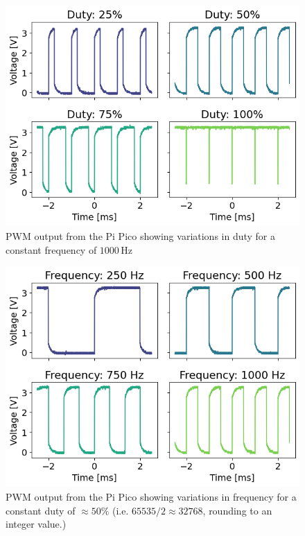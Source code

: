 \documentclass[%
 reprint,
 amsmath,amssymb,
 aps,
]{revtex4-2}
\begin{document}
    \begin{figure}
        \includegraphics[width=0.9\columnwidth]{Images/constFreq.png}
        \caption{\label{fig:constFreq}PWM output from the Pi Pico showing variations in duty for a constant frequency of $1000 \,\text{Hz}$}
    \end{figure}
    \begin{figure}
        \includegraphics[width=0.9\columnwidth]{Images/constDuty.png}
        \caption{\label{fig:constDuty}PWM output from the Pi Pico showing variations in frequency for a constant duty of $\approx 50$\% (i.e. $65535/2 \approx 32768$, rounding to an integer value.)}
    \end{figure}
\end{document}
